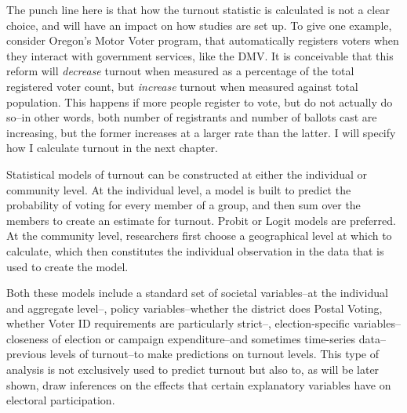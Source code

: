 \documentclass[12pt,twoside]{reedthesis}
\begin{document}
  The punch line here is that how the turnout statistic is calculated is
  not a clear choice, and will have an impact on how studies are set up.
  To give one example, consider Oregon's Motor Voter program, that
  automatically registers voters when they interact with government
  services, like the DMV. It is conceivable that this reform will
  \emph{decrease} turnout when measured as a percentage of the total
  registered voter count, but \emph{increase} turnout when measured
  against total population. This happens if more people register to vote,
  but do not actually do so--in other words, both number of registrants
  and number of ballots cast are increasing, but the former increases at a
  larger rate than the latter. I will specify how I calculate turnout in
  the next chapter.
  
  Statistical models of turnout can be constructed at either the
  individual or community level. At the individual level, a model is built
  to predict the probability of voting for every member of a group, and
  then sum over the members to create an estimate for turnout. Probit or
  Logit models are preferred. At the community level, researchers first
  choose a geographical level at which to calculate, which then
  constitutes the individual observation in the data that is used to
  create the model.
  
  Both these models include a standard set of societal variables--at the
  individual and aggregate level--, policy variables--whether the district
  does Postal Voting, whether Voter ID requirements are particularly
  strict--, election-specific variables--closeness of election or campaign
  expenditure--and sometimes time-series data--previous levels of
  turnout--to make predictions on turnout levels. This type of analysis is
  not exclusively used to predict turnout but also to, as will be later
  shown, draw inferences on the effects that certain explanatory variables
  have on electoral participation.
  
\end{document}
